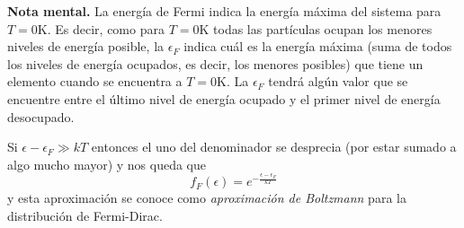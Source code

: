 \documentclass[12pt,a4paper]{article}
\begin{document}
\textbf{Nota mental.} La energía de Fermi indica la energía máxima del sistema para $T=0$K. Es decir, como para $T=0$K todas las partículas ocupan los menores niveles de energía posible, la $\epsilon _{F}$ indica cuál es la energía máxima (suma de todos los niveles de energía ocupados, es decir, los menores posibles) que tiene un elemento cuando se encuentra a $T=0$K. La $\epsilon _{F}$ tendrá algún valor que se encuentre entre el último nivel de energía ocupado y el primer nivel de energía desocupado.

Si $\epsilon - \epsilon _{F} \gg kT$ entonces el uno del denominador se desprecia (por estar sumado a algo mucho mayor) y nos queda que
\[ f_{F}(\epsilon)=e^{-\frac{\epsilon- \epsilon _{F}}{kT}} \]
y esta aproximación se conoce como \emph{aproximación de Boltzmann} para la distribución de Fermi-Dirac.
\end{document}
